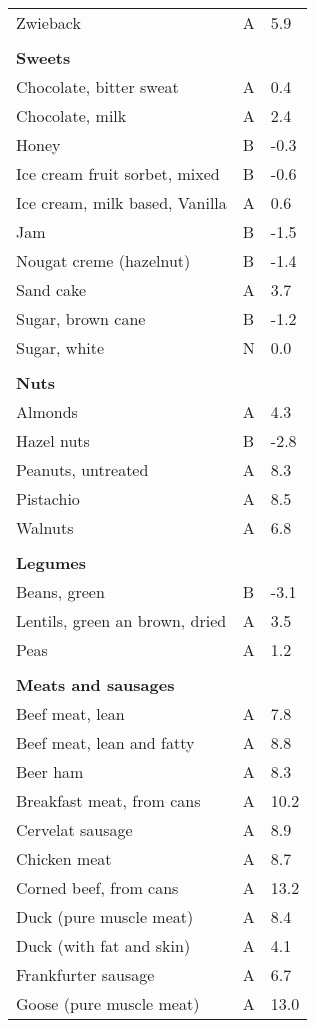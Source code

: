 \documentclass[../main.tex]{subfiles}
\begin{document}
\begin{longtable}{p{7cm}p{0.5cm}p{1cm}}
Zwieback  & A  & 5.9 \\
 \\
\multicolumn{3}{l}{\textbf{Sweets}} \\
Chocolate, bitter sweat  & A  & 0.4 \\
Chocolate, milk  & A  & 2.4 \\
Honey  & B  & -0.3 \\
Ice cream fruit sorbet, mixed  & B  & -0.6 \\
Ice cream, milk based, Vanilla  & A  & 0.6 \\
Jam  & B  & -1.5 \\
Nougat creme (hazelnut)  & B  & -1.4 \\
Sand cake  & A  & 3.7 \\
Sugar, brown cane  & B  & -1.2 \\
Sugar, white  & N  & 0.0 \\
 \\
\multicolumn{3}{l}{\textbf{Nuts}} \\
Almonds  & A  & 4.3 \\
Hazel nuts  & B  & -2.8 \\
Peanuts, untreated  & A  & 8.3 \\
Pistachio  & A  & 8.5 \\
Walnuts  & A  & 6.8 \\
 \\
\multicolumn{3}{l}{\textbf{Legumes}} \\
Beans, green  & B  & -3.1 \\
Lentils, green an brown, dried  & A  & 3.5 \\
Peas  & A  & 1.2 \\
 \\
\multicolumn{3}{l}{\textbf{Meats and sausages}} \\
Beef meat, lean  & A  & 7.8 \\
Beef meat, lean and fatty  & A  & 8.8 \\
Beer ham  & A  & 8.3 \\
Breakfast meat, from cans  & A  & 10.2 \\
Cervelat sausage  & A  & 8.9 \\
Chicken meat  & A  & 8.7 \\
Corned beef, from cans  & A  & 13.2 \\
Duck (pure muscle meat)  & A  & 8.4 \\
Duck (with fat and skin)  & A  & 4.1 \\
Frankfurter sausage  & A  & 6.7 \\
Goose (pure muscle meat)  & A  & 13.0 \\

\end{longtable}
\end{document}
